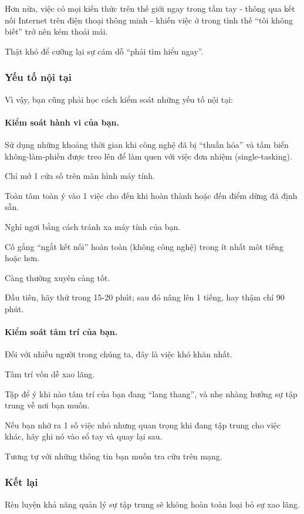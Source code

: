 \documentclass{article}
\begin{document}
%
Hơn nữa, việc có mọi kiến thức trên thế giới ngay trong tầm tay - thông qua kết nối Internet trên điện thoại thông minh - khiến việc ở trong tình thế ``tôi không biết'' trở nên kém thoải mái.

Thật khó để cưỡng lại sự cám dỗ ``phải tìm hiểu ngay''.

\subsubsection{Yếu tố nội tại}
Vì vậy, bạn cũng phải học cách kiểm soát những yếu tố nội tại:

\paragraph{Kiểm soát hành vi của bạn.} Sử dụng những khoảng thời gian khi công nghệ đã bị ``thuần hóa'' và tấm biển không-làm-phiền được treo lên để làm quen với việc đơn nhiệm (single-tasking).

Chỉ mở 1 cửa số trên màn hình máy tính.

Toàn tâm toàn ý vào 1 việc cho đến khi hoàn thành hoặc đến điểm dừng đã định sẵn.

Nghỉ ngơi bằng cách tránh xa máy tính của bạn.

Cố gắng ``ngắt kết nối'' hoàn toàn (không công nghệ) trong ít nhất môt tiếng hoặc hơn.

Càng thường xuyên càng tốt.

Đầu tiên, hãy thử trong 15-20 phút; sau đó nâng lên 1 tiếng, hay thậm chí 90 phút.

\paragraph{Kiểm soát tâm trí của bạn.} Đối với nhiều người trong chúng ta, đây là việc khó khăn nhất.

Tâm trí vốn dễ xao lãng.

Tập để ý khi nào tâm trí của bạn đang ``lang thang'', và nhẹ nhàng hướng sự tập trung về nơi bạn muốn.

Nếu bạn nhớ ra 1 số việc nhỏ nhưng quan trọng khi đang tập trung cho việc khác, hãy ghi nó vào sổ tay và quay lại sau.

Tương tự với những thông tin bạn muốn tra cứu trên mạng.

\subsubsection{Kết lại}
Rèn luyện khả năng quản lý sự tập trung sẽ không hoàn toàn loại bỏ sự xao lãng.
\end{document}
